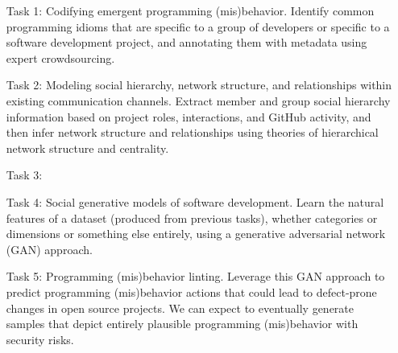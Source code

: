 \begin{itemize}
  \addtolength{\itemindent}{3.9mm}
  \item[Task 1:] Codifying emergent programming (mis)behavior. Identify common
  programming idioms that are specific to a group of developers or specific to a
  software development project, and annotating them with metadata using expert
  crowdsourcing.
  \item[Task 2:] Modeling social hierarchy, network structure, and relationships
  within existing communication channels. Extract member and group social
  hierarchy information based on project roles, interactions, and GitHub
  activity, and then infer network structure and relationships using theories of
  hierarchical network structure and centrality.
  \item[Task 3:] 
  \item[Task 4:] Social generative models of software development. Learn the
  natural features of a dataset (produced from previous tasks), whether
  categories or dimensions or something else entirely, using a generative
  adversarial network (GAN) approach.
  \item[Task 5:] Programming (mis)behavior linting. Leverage this GAN approach
  to predict programming (mis)behavior actions that could lead to defect-prone
  changes in open source projects. We can expect to eventually generate samples
  that depict entirely plausible programming (mis)behavior with security risks.


\end{itemize}

